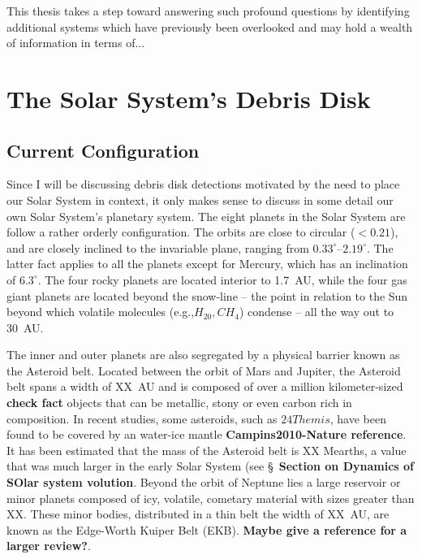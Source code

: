     This thesis takes a step toward answering such profound questions by identifying additional systems which have previously been overlooked and may hold a wealth of information in terms of...
    
    
    
\section{The Solar System's Debris Disk}\label{sec:ch1_ssdisk}

     \subsection{Current Configuration}
    
    Since I will be discussing debris disk detections motivated by the need to place our Solar System in context, it only makes sense to discuss in some detail our own Solar System's planetary system. The eight planets in the Solar System are follow a rather orderly configuration. The orbits are close to circular ($<0.21$), and are closely inclined to the invariable plane, ranging from $0.33^{\circ}$--$2.19^{\circ}$. The latter fact applies to all the planets except for Mercury, which has an inclination of $6.3^{\circ}$. The four rocky planets are located interior to 1.7~AU, while the four gas giant planets are located beyond the snow-line -- the point in relation to the Sun beyond which volatile molecules (e.g.,$H_20, CH_4$) condense -- all the way out to 30~AU. 
    
    
    
    
    The inner and outer planets are also segregated by a physical barrier known as the Asteroid belt. Located between the orbit of Mars and Jupiter, the Asteroid belt spans a width of XX~AU and is composed of over a million kilometer-sized \textbf{check fact} objects that can be metallic, stony or even carbon rich in composition. In recent studies, some asteroids, such as $24 Themis$, have been found to be covered by an water-ice mantle \textbf{Campins2010-Nature reference}. It has been estimated that the mass of the Asteroid belt is XX Mearths, a value that was much larger in the early Solar System (see \S~\textbf{Section on Dynamics of SOlar system volution}. Beyond the orbit of Neptune lies a large reservoir or minor planets composed of icy, volatile, cometary material with sizes greater than XX. These minor bodies, distributed in a thin belt the width of XX~AU, are known as the Edge-Worth Kuiper Belt (EKB). \textbf{Maybe give a reference for a larger review?}.
    
